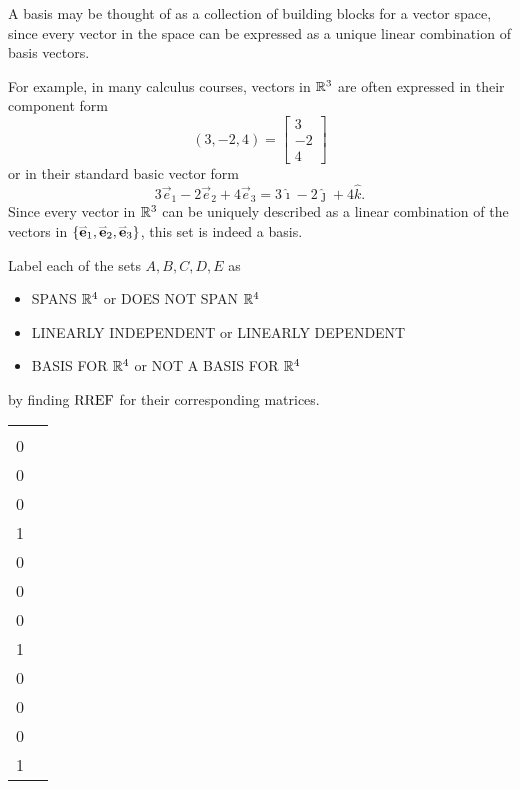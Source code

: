 \begin{applicationActivities}
\begin{definition}
  \end{definition}

\begin{observation}
  A basis may be thought of as a collection of building blocks for a vector
  space,  since every vector in the space can be expressed as a unique linear
  combination of basis vectors.

  \vspace{1em}

  For example, in many calculus courses, vectors in \(\mathbb{R}^3\)
  are often expressed in their component form
  \[
    (3,-2,4)=\begin{bmatrix}3 \\ -2 \\ 4\end{bmatrix}
  \]
  or in their standard basic vector form
  \[
    3\vec e_1-2\vec e_2+4\vec e_3 = 3\hat\imath-2\hat\jmath+4\hat k
  .\]
  Since every vector in \(\mathbb{R}^3\) can be uniquely described as a linear
  combination of the vectors in \(\left\{\mathbf{\accentset{\rightharpoonup}{e}}_1,\mathbf{\accentset{\rightharpoonup}{e}}_2,\mathbf{\accentset{\rightharpoonup}{e}}_3\right\}\),
  this set is indeed a basis.
\end{observation}



\begin{activity}{15}
  Label each of the sets \(A,B,C,D,E\) as
  \begin{itemize}
     \item SPANS \(\mathbb{R}^4\) or DOES NOT SPAN \(\mathbb{R}^4\)
     \item LINEARLY INDEPENDENT or LINEARLY DEPENDENT
     \item BASIS FOR \(\mathbb{R}^4\) or NOT A BASIS FOR \(\mathbb{R}^4\)
  \end{itemize}
  by finding \(\operatorname{RREF}\) for their corresponding matrices.
  \begin{center}
    \begin{tabular}{cc}
  	\(A=\left\{
      \begin{bmatrix}1\\0\\0\\0\end{bmatrix},
      \begin{bmatrix}0\\1\\0\\0\end{bmatrix},
      \begin{bmatrix}0\\0\\1\\0\end{bmatrix},
      \begin{bmatrix}0\\0\\0\\1\end{bmatrix}
      \right\}
      \)   &


\end{tabular}
\end{center}
\end{activity}
\end{applicationActivities}
